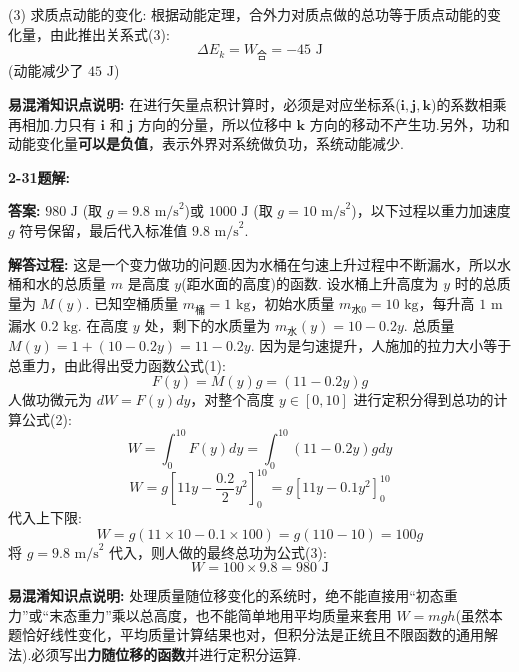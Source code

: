 (3) 求质点动能的变化:
根据动能定理，合外力对质点做的总功等于质点动能的变化量，由此推出关系式(3):
\begin{equation}
	\Delta E_k = W_{\text{合}} = -45\text{ J}
\end{equation}
(动能减少了 $45\text{ J}$)

\textbf{易混淆知识点说明:}
在进行矢量点积计算时，必须是对应坐标系($\mathbf{i}, \mathbf{j}, \mathbf{k}$)的系数相乘再相加.力只有 $\mathbf{i}$ 和 $\mathbf{j}$ 方向的分量，所以位移中 $\mathbf{k}$ 方向的移动不产生功.另外，功和动能变化量\textbf{可以是负值}，表示外界对系统做负功，系统动能减少.

\vspace{2em}

\textbf{2-31题解:}


\textbf{答案:} $980\text{ J}$ (取 $g=9.8\text{ m/s}^2$)或 $1000\text{ J}$ (取 $g=10\text{ m/s}^2$)，以下过程以重力加速度 $g$ 符号保留，最后代入标准值 $9.8\text{ m/s}^2$.

\textbf{解答过程:}
这是一个变力做功的问题.因为水桶在匀速上升过程中不断漏水，所以水桶和水的总质量 $m$ 是高度 $y$(距水面的高度)的函数.
设水桶上升高度为 $y$ 时的总质量为 $M(y)$.
已知空桶质量 $m_{\text{桶}} = 1\text{ kg}$，初始水质量 $m_{\text{水0}} = 10\text{ kg}$，每升高 $1\text{ m}$ 漏水 $0.2\text{ kg}$.
在高度 $y$ 处，剩下的水质量为 $m_{\text{水}}(y) = 10 - 0.2y$.
总质量 $M(y) = 1 + (10 - 0.2y) = 11 - 0.2y$.
因为是匀速提升，人施加的拉力大小等于总重力，由此得出受力函数公式(1):
\begin{equation}
	F(y) = M(y)g = (11 - 0.2y)g
\end{equation}
人做功微元为 $dW = F(y) dy$，对整个高度 $y \in [0, 10]$ 进行定积分得到总功的计算公式(2):
\begin{equation}
	W = \int_{0}^{10} F(y) dy = \int_{0}^{10} (11 - 0.2y)g dy
\end{equation}
$$W = g \left[ 11y - \frac{0.2}{2}y^2 \right]_{0}^{10} = g \left[ 11y - 0.1y^2 \right]_{0}^{10}$$
代入上下限:
$$W = g (11 \times 10 - 0.1 \times 100) = g(110 - 10) = 100g$$
将 $g = 9.8\text{ m/s}^2$ 代入，则人做的最终总功为公式(3):
\begin{equation}
	W = 100 \times 9.8 = 980\text{ J}
\end{equation}

\textbf{易混淆知识点说明:}
处理质量随位移变化的系统时，绝不能直接用“初态重力”或“末态重力”乘以总高度，也不能简单地用平均质量来套用 $W = mgh$(虽然本题恰好线性变化，平均质量计算结果也对，但积分法是正统且不限函数的通用解法).必须写出\textbf{力随位移的函数}并进行定积分运算.

